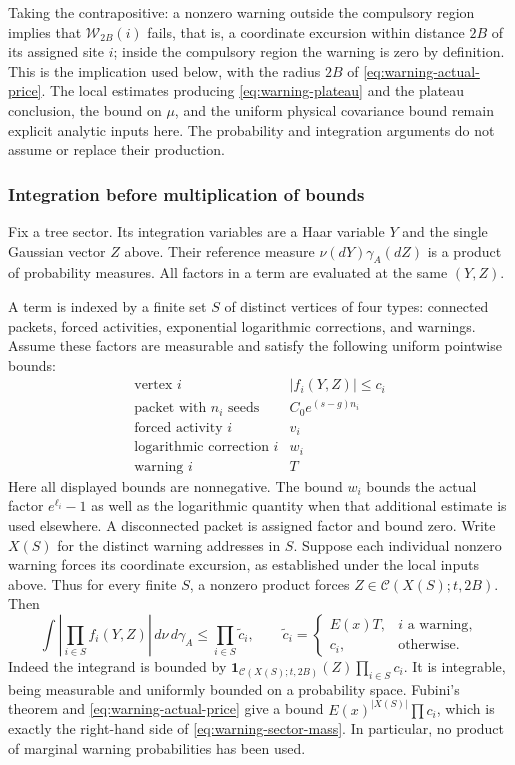 Taking the contrapositive: a nonzero warning outside the compulsory
region implies that $\mathcal W_{2B}(i)$ fails, that is, a coordinate
excursion within distance $2B$ of its assigned site $i$; inside the
compulsory region the warning is zero by definition. This is the
implication used below, with the radius $2B$ of
\eqref{eq:warning-actual-price}. The local estimates producing
\eqref{eq:warning-plateau} and the plateau conclusion, the bound on
$\mu$, and the uniform physical covariance bound remain explicit
analytic inputs here. The probability and integration arguments do
not assume or replace their production.

\subsubsection{Integration before multiplication of bounds}
Fix a tree sector. Its integration variables are a Haar variable $Y$
and the single Gaussian vector $Z$ above. Their reference measure
$\nu(dY)\gamma_A(dZ)$ is a product of probability measures. All factors
in a term are evaluated at the same $(Y,Z)$.

A term is indexed by a finite set $S$ of distinct vertices of four
types: connected packets, forced activities, exponential logarithmic
corrections, and warnings. Assume these factors are measurable and
satisfy the following uniform pointwise bounds:
\[
 \begin{array}{c|c}
 \text{vertex }i&|f_i(Y,Z)|\le c_i\\ \hline
 \text{packet with }n_i\text{ seeds}&
      C_0 e^{(s-g)n_i}\\
 \text{forced activity }i&v_i\\
 \text{logarithmic correction }i&w_i\\
 \text{warning }i&T
 \end{array}
\]
Here all displayed bounds are nonnegative. The bound $w_i$ bounds the
actual factor $e^{\ell_i}-1$ as well as the logarithmic quantity when
that additional estimate is used elsewhere. A disconnected packet is
assigned factor and bound zero. Write $X(S)$ for the distinct warning
addresses in $S$. Suppose each individual nonzero warning forces its
coordinate excursion, as established under the local inputs above.
Thus for every finite $S$, a nonzero product forces
$Z\in\mathcal C(X(S);t,2B)$.
Then
\begin{equation}\label{eq:warning-sector-mass}
 \int\left|\prod_{i\in S}f_i(Y,Z)\right|\,d\nu\,d\gamma_A
 \le \prod_{i\in S}\widetilde c_i,
 \qquad
 \widetilde c_i=
 \begin{cases}E(x)T,&i\text{ a warning},\\c_i,&\text{otherwise}.
 \end{cases}
\end{equation}
Indeed the integrand is bounded by
$\mathbf1_{\mathcal C(X(S);t,2B)}(Z)\prod_{i\in S}c_i$.
It is integrable, being measurable and uniformly bounded on a
probability space. Fubini's theorem and
\eqref{eq:warning-actual-price} give a bound
$E(x)^{|X(S)|}\prod c_i$, which is exactly the right-hand side of
\eqref{eq:warning-sector-mass}. In particular, no product of marginal
warning probabilities has been used.

